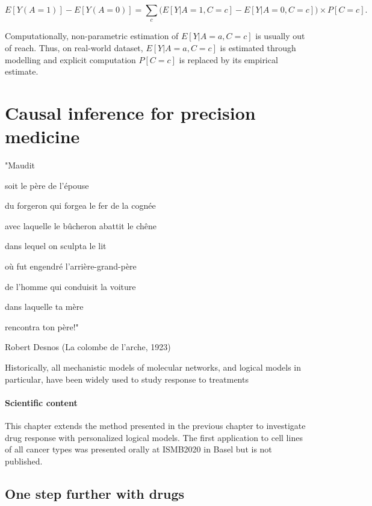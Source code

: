 \documentclass[a4paper,12pt,twoside,onecolumn,openright,final,oldfontcommands]{memoir}
\newcommand{\initial}[1]{
	\lettrine[lines=3,lhang=0.33,nindent=0em]{
		\color{gray}
     		{\textsc{#1}}}{}}
\let\BeginKnitrBlock\begin \let\EndKnitrBlock\end
\begin{document}
\[
E[Y(A=1)] - E[Y(A=0)] = \sum_{c} \Big(E[Y | A=1, C=c]-E[Y | A=0, C=c]\Big) \times P[C=c].
\]

Computationally, non-parametric estimation of \(E[Y | A=a, C=c]\) is
usually out of reach. Thus, on real-world dataset, \(E[Y | A=a, C=c]\)
is estimated through modelling and explicit computation \(P[C=c]\) is
replaced by its empirical estimate.

\chapter{Causal inference for precision
medicine}\label{causal-inference-for-precision-medicine}

\epigraph{"Maudit

soit le père de l'épouse

du forgeron qui forgea le fer de la cognée

avec laquelle le bûcheron abattit le chêne

dans lequel on sculpta le lit

où fut engendré l'arrière-grand-père

de l'homme qui conduisit la voiture

dans laquelle ta mère

rencontra ton père!"}{Robert Desnos (La colombe de l'arche, 1923)}

\initial{H}istorically, all mechanistic models of molecular networks,
and logical models in particular, have been widely used to study
response to treatments

\BeginKnitrBlock{summarybox}
\subsubsection*{Scientific content}\label{scientific-content-6}

This chapter extends the method presented in the previous chapter to
investigate drug response with personalized logical models. The first
application to cell lines of all cancer types was presented orally at
ISMB2020 in Basel but is not published.
\EndKnitrBlock{summarybox}

\section{One step further with
drugs}\label{one-step-further-with-drugs-1}

\citep{de2015pragmatic}
\end{document}
